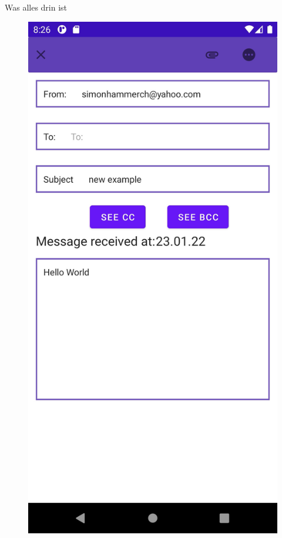 \documentclass[aspectratio=169]{beamer}
\begin{document}
\begin{frame}[plain]{Was alles drin ist}
\begin{figure}[h]
        \includegraphics[height=.7\textheight]{media/emailViewer.jpg}
        \pause

\end{figure}
\end{frame}
\end{document}
